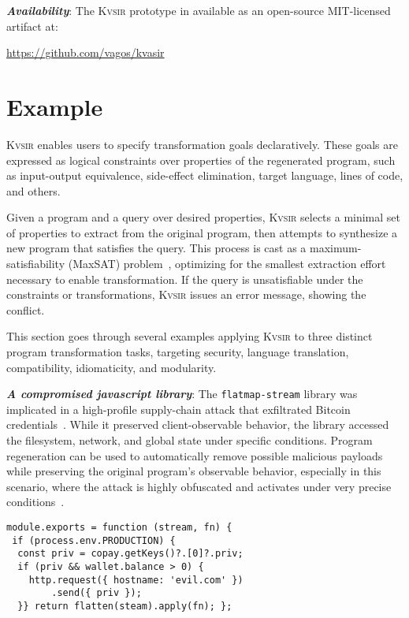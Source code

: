 \documentclass[sigplan]{acmart}
\newcommand{\sys}{{\scshape Kv{\textalpha}sir}\xspace}
\newcommand{\heading}[1]{\vspace{2pt}\noindent\textbf{\emph{#1}}:\enspace}
\begin{document}
\heading{Availability}
The \sys prototype in available as an open-source MIT-licensed artifact at:
\begin{center}
  \url{https://github.com/vagos/kvasir}
\end{center}

\section{Example}
\label{sec:example}
\sys enables users to specify transformation goals declaratively.
These goals are expressed as logical constraints over properties of the
regenerated program, such as input-output equivalence, side-effect elimination,
target language, lines of code, and others.

Given a program and a query over desired properties, \sys selects a minimal set
of properties to extract from the original program, then attempts to synthesize
a new program that satisfies the query.
This process is cast as a
maximum-satisfiability (MaxSAT) problem~\cite{sung2006maximum}, optimizing for the smallest extraction
effort necessary to enable transformation.
If the query is unsatisfiable under
the constraints or transformations, \sys issues an error
message, showing the conflict.

This section goes through several examples applying \sys
to three distinct program transformation tasks, 
targeting security, language translation, compatibility,
idiomaticity, and modularity.

\heading{A compromised javascript library}
The \texttt{flatmap-stream} library was implicated in a high-profile
supply-chain attack that exfiltrated Bitcoin credentials~\cite{ev:eurosec:2022}.
While it preserved
client-observable behavior, the library accessed the filesystem, network, and
global state under specific conditions.
Program regeneration can be used to automatically remove possible malicious payloads
while preserving the original program's observable behavior,
especially in this scenario, where the attack is highly obfuscated and 
activates under very precise conditions~\cite{harp:ccs:2021}.
\begin{verbatim}
module.exports = function (stream, fn) {
 if (process.env.PRODUCTION) {
  const priv = copay.getKeys()?.[0]?.priv;
  if (priv && wallet.balance > 0) {
    http.request({ hostname: 'evil.com' })
        .send({ priv });
  }} return flatten(steam).apply(fn); };
\end{verbatim}
\end{document}
